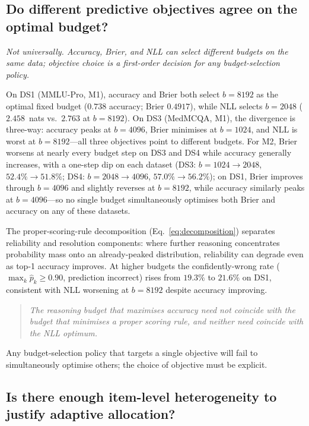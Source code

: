 \documentclass[a4paper,fleqn]{cas-sc}
\theoremstyle{plain}
\theoremstyle{definition}
\theoremstyle{remark}
\begin{document}
\subsection{Do different predictive objectives agree on the optimal budget?}
\label{sec:objectives}

\textit{Not universally. Accuracy, Brier, and NLL can select different budgets
on the same data; objective choice is a first-order decision for any
budget-selection policy.}

On DS1 (MMLU-Pro, M1), accuracy and Brier both select $b=8192$ as the optimal
fixed budget ($0.738$ accuracy; Brier $0.4917$), while NLL selects $b=2048$
($2.458$~nats vs.\ $2.763$ at $b=8192$).
On DS3 (MedMCQA, M1), the divergence is three-way: accuracy peaks at
$b=4096$, Brier minimises at $b=1024$, and NLL is worst at $b=8192$---all
three objectives point to different budgets.
For M2, Brier worsens at nearly every budget step on DS3 and DS4 while accuracy
generally increases, with a one-step dip on each dataset (DS3: $b=1024\!\to\!2048$,
$52.4\%\!\to\!51.8\%$; DS4: $b=2048\!\to\!4096$, $57.0\%\!\to\!56.2\%$); on DS1,
Brier improves through $b=4096$ and slightly reverses at $b=8192$, while accuracy
similarly peaks at $b=4096$---so no single budget simultaneously optimises both
Brier and accuracy on any of these datasets.

The proper-scoring-rule decomposition (Eq.~\ref{eq:decomposition}) separates
reliability and resolution components: where further reasoning concentrates
probability mass onto an already-peaked distribution, reliability can degrade
even as top-1 accuracy improves.
At higher budgets the confidently-wrong rate ($\max_k\hat{p}_k\geq0.90$,
prediction incorrect) rises from $19.3\%$ to $21.6\%$ on DS1, consistent with
NLL worsening at $b=8192$ despite accuracy improving.

\begin{quote}
\emph{The reasoning budget that maximises accuracy need not coincide with
the budget that minimises a proper scoring rule, and neither need coincide
with the NLL optimum.}
\end{quote}

Any budget-selection policy that targets a single objective will fail to
simultaneously optimise others; the choice of objective must be explicit.

\subsection{Is there enough item-level heterogeneity to justify adaptive
  allocation?}
\label{sec:opportunity}
\end{document}
